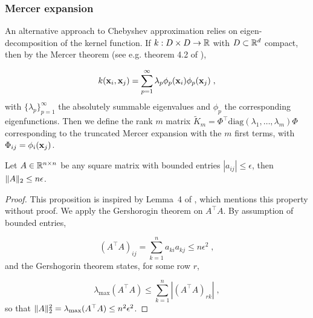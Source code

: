 \documentclass{article}
\begin{document}
\subsubsection{Mercer expansion}

An alternative approach to Chebyshev approximation relies on eigen-decomposition of the kernel function. If $k: D \times D \to \mathbb R$ with $D \subset \mathbb R^d$ compact, then by the Mercer theorem (see e.g. theorem 4.2 of \cite{rasmussen_gaussian_2005}),

\begin{equation*}
    k(\boldsymbol{\mathbf{x}}_i, \boldsymbol{\mathbf{x}}_j) = \sum_{p=1}^\infty \lambda_p \phi_p(\boldsymbol{\mathbf{x}}_i) \phi_p(\boldsymbol{\mathbf{x}}_j) \;,
\end{equation*}
%
with $\{\lambda_p\}_{p=1}^\infty$ the absolutely summable eigenvalues and $\phi_p$ the corresponding eigenfunctions.
Then we define the rank $m$ matrix $\tilde K_m = \Phi^\top \text{diag}(\lambda_1, \ldots, \lambda_m) \Phi$ corresponding to the truncated Mercer expansion with the $m$ first terms, with $\Phi_{ij} = \phi_i(\boldsymbol{\mathbf{x}}_j)$.

\begin{proposition} \label{thm:gershogorin}
Let $A \in \mathbb R^{n \times n}$ be any square matrix with bounded entries $|a_{ij}| \le \epsilon$, then $\Vert A \Vert_2 \le n\epsilon$.
\end{proposition}
\begin{proof}
This proposition is inspired by Lemma~4 of \cite{gardner_gpytorch_2021}, which mentions this property without proof.
We apply the Gershorogin theorem on $A^\top A$. By assumption of bounded entries, 

\begin{equation*}
    (A^\top A)_{ij} = \textstyle\sum_{k=1}^n a_{ki} a_{kj} \le n\epsilon^2 \; ,
\end{equation*}
%
and the Gershogorin theorem states, for some row $r$,

\begin{equation*}
    \lambda_{\max}(A^\top A) \le \textstyle\sum_{k=1}^n |(A^\top A)_{rk}| \; ,
\end{equation*}
%
so that $\Vert A \Vert_2^2 = \lambda_{\max}(A^\top A) \le n^2\epsilon^2$.
\end{proof}
\end{document}

